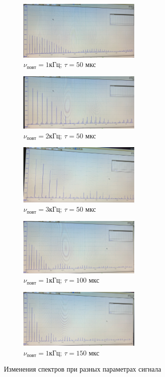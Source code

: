 \begin{figure}[h!]
    \centering
    \begin{subfigure}[b]{0.3\linewidth}
        \centering
        \includegraphics[width=6cm]{./images/nu_1_t_50.jpg}
        \caption{$\nu_{повт} = 1$кГц; $\tau = 50$ мкс}
    \end{subfigure}
    \hfill
    \begin{subfigure}[b]{0.3\linewidth}
        \centering
        \includegraphics[width=6cm]{./images/nu_2_t_50.jpg}
        \caption{$\nu_{повт} = 2$кГц; $\tau = 50$ мкс}
    \end{subfigure}
    \hfill
    \begin{subfigure}{0.3\linewidth}
        \centering
        \includegraphics[width=6cm]{./images/nu_3_t_50.jpg}
        \caption{$\nu_{повт} = 3$кГц; $\tau = 50$ мкс}
    \end{subfigure}
    \vfill
    \begin{subfigure}{0.35\linewidth}
        \centering
        \includegraphics[width=6cm]{./images/nu_1_t_100.jpg}
        \caption{$\nu_{повт} = 1$кГц; $\tau = 100$ мкс}
    \end{subfigure}
    \begin{subfigure}{0.35\linewidth}
        \centering
        \includegraphics[width=6cm]{./images/nu_1_t_150.jpg}
        \caption{$\nu_{повт} = 1$кГц; $\tau = 150$ мкс}
    \end{subfigure}
    \caption{Изменения спектров при разных параметрах сигнала}
\end{figure}

